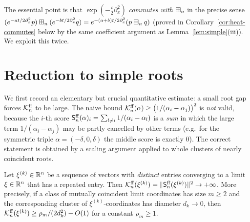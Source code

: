 The essential point is that $\exp(-\tfrac t2\partial_x^2)$ \emph{commutes with}
$\boxplus_n$ in the precise sense
$(e^{-at/2\partial_x^2}p)\boxplus_n(e^{-bt/2\partial_x^2}q)=e^{-(a+b)t/2\partial_x^2}(p\boxplus_n q)$
(proved in Corollary~\ref{cor:heat-commutes} below by the same coefficient
argument as Lemma~\ref{lem:simple}(iii)). We exploit this twice.

\section*{Reduction to simple roots}

We first record an elementary but crucial quantitative estimate: a small root
gap forces $\mathcal{K}^{\mathrm{ff}}_n$ to be large. The naive bound
$\mathcal{K}^{\mathrm{ff}}_n(\alpha)\ge\bigl(1/(\alpha_i-\alpha_j)\bigr)^2$ is \emph{not} valid,
because the $i$-th score $\mathsf{S}^{\mathrm{ff}}_n(\alpha)_i=\sum_{l\ne i}1/(\alpha_i-\alpha_l)$
is a \emph{sum} in which the large term $1/(\alpha_i-\alpha_j)$ may be partly
cancelled by other terms (e.g.\ for the symmetric triple
$\alpha=(-\delta,0,\delta)$ the middle score is exactly $0$). The correct
statement is obtained by a scaling argument applied to whole clusters of nearly
coincident roots.

\begin{qfourlemma}\label{lem:gapblowup}
Let $\xi^{(k)}\in\mathbb{R}^n$ be a sequence of vectors with \emph{distinct} entries
converging to a limit $\xi\in\mathbb{R}^n$ that has a repeated entry. Then
$\mathcal{K}^{\mathrm{ff}}_n(\xi^{(k)})=\|\mathsf{S}^{\mathrm{ff}}_n(\xi^{(k)})\|^2\to+\infty$. More precisely,
if a class of mutually coincident limit coordinates has size $m\ge2$ and the
corresponding cluster of $\xi^{(k)}$-coordinates has diameter $d_k\to0$, then
$\mathcal{K}^{\mathrm{ff}}_n(\xi^{(k)})\ge \rho_m/(2d_k^2)-O(1)$ for a constant $\rho_m\ge1$.
\end{qfourlemma}

